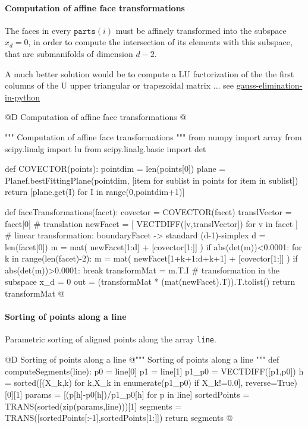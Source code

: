 \documentclass[11pt,oneside]{article}    %
\begin{document}
\paragraph{Computation of affine face transformations}
The faces in every $\texttt{parts}(i)$ must be affinely transformed into the subspace $x_d=0$, in order to compute the intersection of its elements with this subspace, that are submanifolds of dimension $d-2$. 

A much better solution would be to compute a LU factorization of the the first columns of the U upper triangular or trapezoidal matrix ... see \href{http://stackoverflow.com/questions/15638650/is-there-a-standard-solution-for-gauss-elimination-in-python}{gauss-elimination-in-python}

@D Computation of affine face transformations
@{""" Computation of affine face transformations """
from numpy import array
from scipy.linalg import lu
from scipy.linalg.basic import det

def COVECTOR(points):
    pointdim = len(points[0])
    plane = Planef.bestFittingPlane(pointdim,
                    [item for sublist in points for item in sublist])
    return [plane.get(I) for I in range(0,pointdim+1)]

def faceTransformations(facet):
    covector = COVECTOR(facet)
    translVector = facet[0]
    # translation 
    newFacet = [ VECTDIFF([v,translVector]) for v in facet ]
    # linear transformation: boundaryFacet -> standard (d-1)-simplex
    d = len(facet[0])
    m = mat( newFacet[1:d] + [covector[1:]] )
    if abs(det(m))<0.0001:
        for k in range(len(facet)-2):
            m = mat( newFacet[1+k+1:d+k+1] + [covector[1:]] )
            if abs(det(m))>0.0001: break
    transformMat = m.T.I
    # transformation in the subspace x_d = 0
    out = (transformMat * (mat(newFacet).T)).T.tolist()
    return transformMat
@}
    
\paragraph{Sorting of points along a line}

Parametric sorting of aligned points along the array \texttt{line}. 

@D Sorting of points along a line
@{""" Sorting of points along a line """
def computeSegments(line):
    p0 = line[0]
    p1 = line[1]
    p1_p0 = VECTDIFF([p1,p0])
    h = sorted([(X_k,k) for k,X_k in enumerate(p1_p0) if X_k!=0.0], reverse=True)[0][1]
    params = [(p[h]-p0[h])/p1_p0[h] for p in line]
    sortedPoints = TRANS(sorted(zip(params,line)))[1]
    segments = TRANS([sortedPoints[:-1],sortedPoints[1:]])
    return segments
@}
\end{document}

